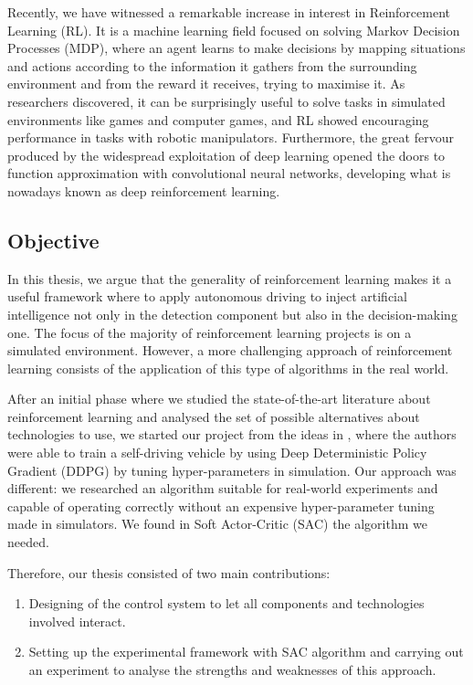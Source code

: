 \documentclass[10pt,twocolumn,letterpaper]{article}
\begin{document}
Recently, we have witnessed a remarkable increase in interest in Reinforcement Learning (RL).
It is a machine learning field focused on solving Markov Decision Processes (MDP), where an agent learns to make decisions by mapping situations and actions according to the information it gathers from the surrounding environment and from the reward it receives, trying to maximise it.
As researchers discovered, it can be surprisingly useful to solve tasks in simulated environments like games and computer games, and RL showed encouraging performance in tasks with robotic manipulators.
Furthermore, the great fervour produced by the widespread exploitation of deep learning opened the doors to function approximation with convolutional neural networks, developing what is nowadays known as deep reinforcement learning.

\subsection{Objective}

In this thesis, we argue that the generality of reinforcement learning makes it a useful framework where to apply autonomous driving to inject artificial intelligence not only in the detection component but also in the decision-making one.
The focus of the majority of reinforcement learning projects is on a simulated environment.
However, a more challenging approach of reinforcement learning consists of the application of this type of algorithms in the real world.

After an initial phase where we studied the state-of-the-art literature about reinforcement learning and analysed the set of possible alternatives about technologies to use, we started our project from the ideas in \cite{kendall2019learning}, where the authors were able to train a self-driving vehicle by using Deep Deterministic Policy Gradient (DDPG) \cite{lillicrap2015continuous} by tuning hyper-parameters in simulation.
Our approach was different: we researched an algorithm suitable for real-world experiments and capable of operating correctly without an expensive hyper-parameter tuning made in simulators.
We found in Soft Actor-Critic (SAC) \cite{haarnoja2018soft} the algorithm we needed.

Therefore, our thesis consisted of two main contributions:
\begin{enumerate}
    \item Designing of the control system to let all components and technologies involved interact.
    \item Setting up the experimental framework with SAC algorithm and carrying out an experiment to analyse the strengths and weaknesses of this approach.
\end{enumerate}
\end{document}
